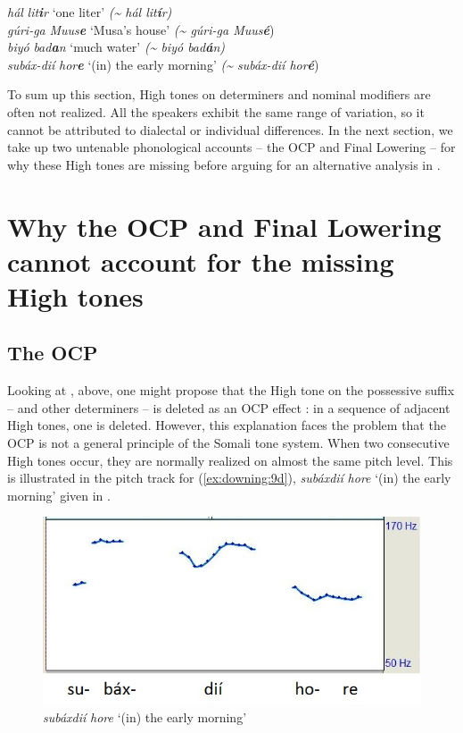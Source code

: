\documentclass[output=paper]{langscibook}
\begin{document}
\ea \label{ex:downing:9}
\ea  \textit{hál} \textit{lit}\textbf{\textit{i}}\textit{r}  ‘one liter’  \textit{({\textasciitilde} hál lit}\textbf{\textit{í}}\textit{r)}  \label{ex:downing:9a}\\
\ex   \textit{gúri-ga} \textit{Muus}\textbf{\textit{e}}  ‘Musa’s house’  \textit{({\textasciitilde} gúri-ga Muus}\textbf{\textit{é}}) \label{ex:downing:9b}\\
\ex   \textit{biyó} \textit{bad}\textbf{\textit{a}}\textit{n}  ‘much water’  \textit{({\textasciitilde} biyó bad}\textbf{\textit{á}}\textit{n)} \label{ex:downing:9c}\\
\ex   \textit{subáx-dií} \textit{hor}\textbf{\textit{e}}  ‘(in) the early morning’  \textit{({\textasciitilde} subáx-dií hor}\textbf{\textit{é}}) \label{ex:downing:9d}\\
\z
\z

To sum up this section, High tones on determiners and nominal modifiers are often not realized. All the speakers exhibit the same range of variation, so it cannot be attributed to dialectal or individual differences. In the next section, we take up two untenable phonological accounts – the OCP and Final Lowering – for why these High tones are missing before arguing for an alternative analysis in .


\section{Why the OCP and Final Lowering cannot account for the missing High tones}
\label{sec:downing:3}

\subsection{The OCP}


Looking at , above, one might propose that the High tone on the possessive suffix – and other determiners – is deleted as an OCP effect \citep{Leben1973}: in a sequence of adjacent High tones, one is deleted. However, this explanation faces the problem that the OCP is not a general principle of the Somali tone system. When two consecutive High tones occur, they are normally realized on almost the same pitch level. This is illustrated in the pitch track for (\ref{ex:downing:9d}), \textit{subáxdií} \textit{hore} ‘(in) the early morning’ given in .

  
\begin{figure}
\includegraphics[width=.75\textwidth]{figures/downing-img2.jpg}
\caption{\textit{subáxdií} \textit{hore} ‘(in) the early morning’}                
\label{fig:downing:2}
\end{figure}
 
\end{document}

